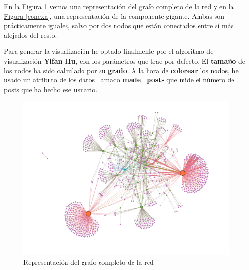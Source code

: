 \documentclass[10pt,a4paper,spanish]{article}
\numberwithin{equation}{section} %
\numberwithin{figure}{section} %
\numberwithin{table}{section} %
\begin{document}
En la \hyperref[completo]{Figura \ref*{completo}} vemos una representación del grafo completo de la red y en la \hyperref[conexa]{Figura \ref*{conexa}}, una representación de la componente gigante. Ambas son prácticamente iguales, salvo por dos nodos que están conectados entre sí más alejados del resto. 

Para generar la visualización he optado finalmente por el algoritmo de visualización \textbf{Yifan Hu}, con los parámetros que trae por defecto. El \textbf{tamaño} de los nodos ha sido calculado por su \textbf{grado}. A la hora de \textbf{colorear} los nodos, he usado un atributo de los datos llamado \textbf{made\_posts} que mide el número de posts que ha hecho ese usuario. 


\begin{figure}[!h]
    \centering
    \includegraphics[width=\textwidth]{1}
    \caption{Representación del grafo completo de la red}
    \label{completo}
\end{figure}
\end{document}
